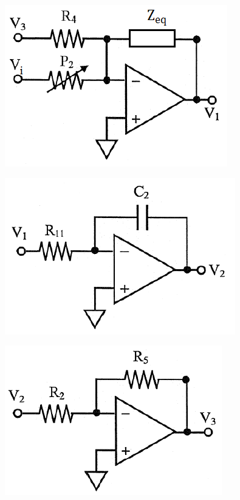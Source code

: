 \documentclass[a4paper,11pt]{report}
\begin{document}
\begin{multicols}{3}
\begin{center}
\includegraphics[scale=0.5]{circuito_A.png}
\end{center}
\begin{center}
\includegraphics[scale=0.5]{circuito_B.png}
\end{center}
\begin{center}
\includegraphics[scale=0.5]{circuito_C.png}
\end{center}
\end{multicols}
 \label{fig:circuitoselementaresTT}
\end{document}
